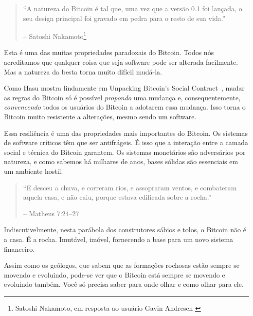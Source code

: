 \begin{quotation}\begin{samepage}
\enquote{A natureza do Bitcoin é tal que, uma vez que a versão 0.1 foi lançada, o seu design principal foi gravado em pedra para o resto de sua vida.}
\begin{flushright} -- Satoshi Nakamoto\footnote{Satoshi Nakamoto, em resposta ao usuário Gavin Andresen \cite{satoshi-centralized-nature}}
\end{flushright}\end{samepage}\end{quotation}

Esta é uma das muitas propriedades paradoxais do Bitcoin. Todos nós acreditamos que qualquer coisa que seja software pode ser alterada facilmente. Mas a natureza da besta torna muito difícil mudá-la.

Como Hasu mostra lindamente em Unpacking Bitcoin's Social Contract~\cite{social-contract}, mudar as regras do Bitcoin só é possível \textit{propondo} uma mudança e, consequentemente, \textit{convencendo} todos os usuários do Bitcoin a adotarem essa mudança. Isso torna o Bitcoin muito resistente a alterações, mesmo sendo um software.

Essa resiliência é uma das propriedades mais importantes do Bitcoin. Os sistemas de software críticos têm que ser antifrágeis. É isso que a interação entre a camada social e técnica do Bitcoin garantem. Os sistemas monetários são adversários por natureza, e como sabemos há milhares de anos, bases sólidas são essenciais em um ambiente hostil.

\begin{quotation}\begin{samepage}
\enquote{E desceu a chuva, e correram rios, e assopraram ventos, e combateram aquela casa, e não caiu, porque estava edificada sobre a rocha.}
\begin{flushright} -- Matheus 7:24--27
\end{flushright}\end{samepage}\end{quotation}

Indiscutivelmente, nesta parábola dos construtores sábios e tolos, o Bitcoin não é a casa. É a rocha. Imutável, imóvel, fornecendo a base para um novo sistema financeiro.

Assim como os geólogos, que sabem que as formações rochosas estão sempre se movendo e evoluindo, pode-se ver que o Bitcoin está sempre se movendo e evoluindo também. Você só precisa saber para onde olhar e como olhar para ele.

